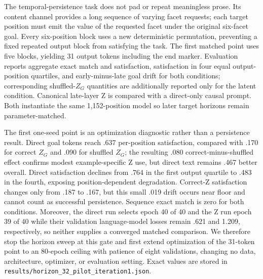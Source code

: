 \documentclass[11pt]{article}
\begin{document}
The temporal-persistence task does not pad or repeat meaningless prose. Its content channel provides a long sequence of varying facet requests; each target position must emit the value of the requested facet under the original six-facet goal. Every six-position block uses a new deterministic permutation, preventing a fixed repeated output block from satisfying the task. The first matched point uses five blocks, yielding 31 output tokens including the end marker. Evaluation reports aggregate exact match and satisfaction, satisfaction in four equal output-position quartiles, and early-minus-late goal drift for both conditions; corresponding shuffled-$Z_G$ quantities are additionally reported only for the latent condition. Canonical late-layer Z is compared with a direct-only causal prompt. Both instantiate the same 1,152-position model so later target horizons remain parameter-matched.

The first one-seed point is an optimization diagnostic rather than a persistence result. Direct goal tokens reach .637 per-position satisfaction, compared with .170 for correct $Z_G$ and .090 for shuffled $Z_G$; the resulting .080 correct-minus-shuffled effect confirms modest example-specific Z use, but direct text remains .467 better overall. Direct satisfaction declines from .764 in the first output quartile to .483 in the fourth, exposing position-dependent degradation. Correct-Z satisfaction changes only from .187 to .167, but this small .019 drift occurs near floor and cannot count as successful persistence. Sequence exact match is zero for both conditions. Moreover, the direct run selects epoch 40 of 40 and the Z run epoch 39 of 40 while their validation language-model losses remain .621 and 1.209, respectively, so neither supplies a converged matched comparison. We therefore stop the horizon sweep at this gate and first extend optimization of the 31-token point to an 80-epoch ceiling with patience of eight validations, changing no data, architecture, optimizer, or evaluation setting. Exact values are stored in \texttt{results/horizon\_32\_pilot\_iteration1.json}.
\end{document}
